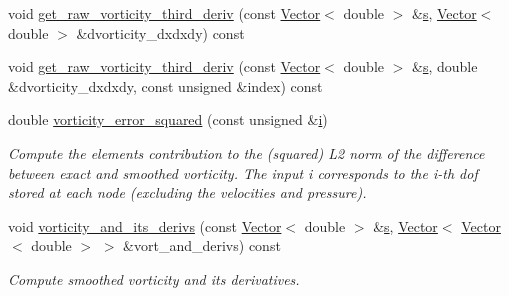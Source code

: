 \begin{DoxyCompactItemize}
\item 
void \hyperlink{classoomph_1_1VorticitySmootherElement_aae5d2fb00a4107e1ec729a4e804ef5b1}{get\+\_\+raw\+\_\+vorticity\+\_\+third\+\_\+deriv} (const \hyperlink{classoomph_1_1Vector}{Vector}$<$ double $>$ \&\hyperlink{cfortran_8h_ab7123126e4885ef647dd9c6e3807a21c}{s}, \hyperlink{classoomph_1_1Vector}{Vector}$<$ double $>$ \&dvorticity\+\_\+dxdxdy) const
\item 
void \hyperlink{classoomph_1_1VorticitySmootherElement_aea23c14dd7f145afe6a73eabf715e5df}{get\+\_\+raw\+\_\+vorticity\+\_\+third\+\_\+deriv} (const \hyperlink{classoomph_1_1Vector}{Vector}$<$ double $>$ \&\hyperlink{cfortran_8h_ab7123126e4885ef647dd9c6e3807a21c}{s}, double \&dvorticity\+\_\+dxdxdy, const unsigned \&index) const
\item 
double \hyperlink{classoomph_1_1VorticitySmootherElement_a6987508c3afae70605d1bc73b27607d6}{vorticity\+\_\+error\+\_\+squared} (const unsigned \&\hyperlink{cfortran_8h_adb50e893b86b3e55e751a42eab3cba82}{i})
\begin{DoxyCompactList}\small\item\em Compute the element\textquotesingle{}s contribution to the (squared) L2 norm of the difference between exact and smoothed vorticity. The input i corresponds to the i-\/th dof stored at each node (excluding the velocities and pressure). \end{DoxyCompactList}\item 
void \hyperlink{classoomph_1_1VorticitySmootherElement_a4bd88c454b07db0ef8b44e7912651425}{vorticity\+\_\+and\+\_\+its\+\_\+derivs} (const \hyperlink{classoomph_1_1Vector}{Vector}$<$ double $>$ \&\hyperlink{cfortran_8h_ab7123126e4885ef647dd9c6e3807a21c}{s}, \hyperlink{classoomph_1_1Vector}{Vector}$<$ \hyperlink{classoomph_1_1Vector}{Vector}$<$ double $>$ $>$ \&vort\+\_\+and\+\_\+derivs) const
\begin{DoxyCompactList}\small\item\em Compute smoothed vorticity and its derivatives. \end{DoxyCompactList}\end{DoxyCompactItemize}
